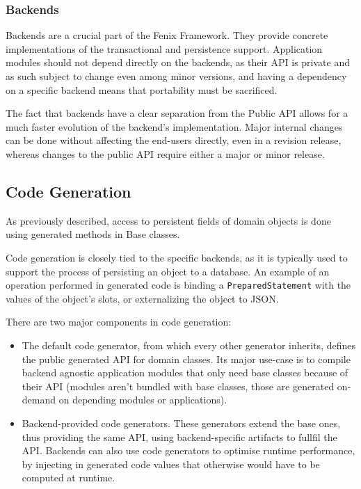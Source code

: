 \documentclass{llncs}
\begin{document}
\subsubsection{Backends}

Backends are a crucial part of the Fenix Framework. They provide
concrete implementations of the transactional and persistence
support. Application modules should not depend directly on the
backends, as their API is private and as such subject to change even
among minor versions, and having a dependency on a specific backend
means that portability must be sacrificed.

The fact that backends have a clear separation from the Public API
allows for a much faster evolution of the backend's
implementation. Major internal changes can be done without affecting
the end-users directly, even in a revision release, whereas changes to
the public API require either a major or minor release.

\subsection{Code Generation}
\label{sec:codeGen}

As previously described, access to persistent fields of domain objects
is done using generated methods in Base classes.

Code generation is closely tied to the specific backends, as it is
typically used to support the process of persisting an object to a
database. An example of an operation performed in generated code is
binding a \texttt{PreparedStatement} with the values of the object's
slots, or externalizing the object to JSON.

There are two major components in code generation:

\begin{itemize}

\item The default code generator, from which every other generator
  inherits, defines the public generated API for domain classes. Its
  major use-case is to compile backend agnostic application modules
  that only need base classes because of their API (modules aren't
  bundled with base classes, those are generated on-demand on
  depending modules or applications).

\item Backend-provided code generators. These generators extend the
  base ones, thus providing the same API, using backend-specific
  artifacts to fullfil the API. Backends can also use code generators
  to optimise runtime performance, by injecting in generated code
  values that otherwise would have to be computed at runtime.
\end{itemize}
\end{document}
